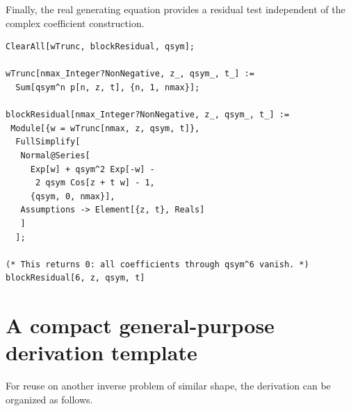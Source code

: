\documentclass[11pt,oneside]{article}
\numberwithin{equation}{section}
\begin{document}
Finally, the real generating equation provides a residual test independent of
the complex coefficient construction.

\begin{lstlisting}
ClearAll[wTrunc, blockResidual, qsym];

wTrunc[nmax_Integer?NonNegative, z_, qsym_, t_] :=
  Sum[qsym^n p[n, z, t], {n, 1, nmax}];

blockResidual[nmax_Integer?NonNegative, z_, qsym_, t_] :=
 Module[{w = wTrunc[nmax, z, qsym, t]},
  FullSimplify[
   Normal@Series[
     Exp[w] + qsym^2 Exp[-w] -
      2 qsym Cos[z + t w] - 1,
     {qsym, 0, nmax}],
   Assumptions -> Element[{z, t}, Reals]
   ]
  ];

(* This returns 0: all coefficients through qsym^6 vanish. *)
blockResidual[6, z, qsym, t]
\end{lstlisting}

\section{A compact general-purpose derivation template}
\label{app:template}

For reuse on another inverse problem of similar shape, the derivation can be
organized as follows.
\end{document}
